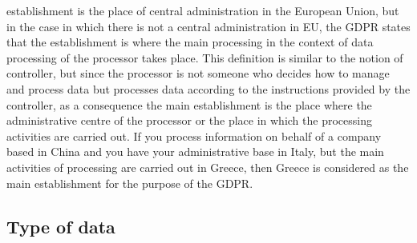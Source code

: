 establishment is the place of central administration in the European Union, but in the case in which there is not a central administration in EU, the GDPR states that the establishment is where the main processing in the context of data processing of the processor takes place. This definition is similar to the notion of controller, but since the processor is not someone who decides how to manage and process data but processes data according to the instructions provided by the controller, as a consequence the main establishment is the place where the administrative centre of the processor or the place in which the processing activities are carried out. If you process information on behalf of a company based in China and you have your administrative base in Italy, but the main activities of processing are carried out in Greece, then Greece is considered as the main establishment for the purpose of the GDPR.
\subsection{Type of data}
